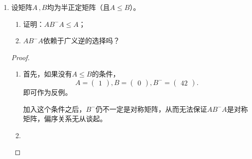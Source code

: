\documentclass[10pt]{article}
\theoremstyle{definition}
\theoremstyle{definition}
\begin{document}
\begin{enumerate}
        \begin{proof}
            由初等变换，易见
            \begin{equation*}
                \begin{pmatrix}
                    A & B \\
                    C & D
                \end{pmatrix}
                \begin{pmatrix}
                    \mathrm{I} & -A^{-1}B \\
                    0 & \mathrm{I}
                \end{pmatrix}=
                \begin{pmatrix}
                    A & 0 \\
                    C & D-CA^{-1}B
                \end{pmatrix}
            \end{equation*}
            从而结论成立。
        \end{proof}

    \item	%
        设矩阵$A\, ,B$均为半正定矩阵（且$A\le B$）。
        \begin{enumerate}[label=(\roman*)]
            \item 证明：$AB^-A\le A$；
            \item$AB^-A$依赖于广义逆的选择吗？
        \end{enumerate}

        \begin{proof}
            \begin{enumerate}[label=(\roman*)]
                \def\labelenumi{(\roman{enumi})}
            \item
                首先，如果没有$A\le B$的条件，
                \begin{equation*}
                    A = \begin{pmatrix} 1 \end{pmatrix},
                    B = \begin{pmatrix} 0 \end{pmatrix},
                    B^- = \begin{pmatrix} 42 \end{pmatrix}.
                \end{equation*}
                即可作为反例。

                加入这个条件之后，$B^-$仍不一定是对称矩阵，从而无法保证$AB^-A$是对称矩阵，偏序关系无从谈起。
            \item
        \end{enumerate}
    \end{proof}


\end{enumerate}
\end{document}
